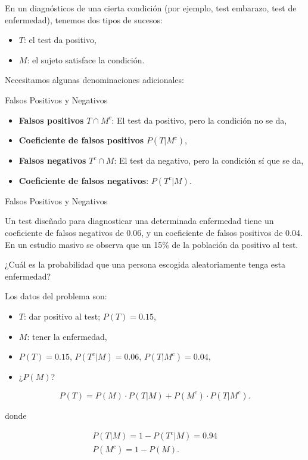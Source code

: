 \documentclass[
  letterpaper,
  DIV=11,
  numbers=noendperiod]{scrreprt}
\providecommand{\tightlist}{%
  \setlength{\itemsep}{0pt}\setlength{\parskip}{0pt}}\usepackage{longtable,booktabs,array}
\begin{document}
En un diagnósticos de una cierta condición (por ejemplo, test embarazo,
test de enfermedad), tenemos dos tipos de sucesos:

\begin{itemize}
\tightlist
\item
  \(T\): el test da positivo,
\item
  \(M\): el sujeto satisface la condición.
\end{itemize}

Necesitamos algunas denominaciones adicionales:

Falsos Positivos y Negativos

\begin{itemize}
\tightlist
\item
  \textbf{Falsos positivos} \(T\cap M^c\): El test da positivo, pero la
  condición no se da,
\item
  \textbf{Coeficiente de falsos positivos} \(P(T|M^c)\),
\item
  \textbf{Falsos negativos} \(T^c\cap M\): El test da negativo, pero la
  condición sí que se da,
\item
  \textbf{Coeficiente de falsos negativos}: \(P(T^c|M)\).
\end{itemize}

Falsos Positivos y Negativos

Un test diseñado para diagnosticar una determinada enfermedad tiene un
coeficiente de falsos negativos de 0.06, y un coeficiente de falsos
positivos de 0.04. En un estudio masivo se observa que un 15\% de la
población da positivo al test.

¿Cuál es la probabilidad que una persona escogida aleatoriamente tenga
esta enfermedad?

Los datos del problema son:

\begin{itemize}
\tightlist
\item
  \(T\): dar positivo al test; \(P(T)=0.15\),
\item
  \(M\): tener la enfermedad,
\item
  \(P(T)=0.15\), \(P(T^c|M)=0.06\), \(P(T|M^c)=0.04\),
\item
  ¿\(P(M)\)?
\end{itemize}

\[
P(T) =P(M)\cdot P(T|M)+P(M^c)\cdot P(T|M^c).
\]

donde

\[
\begin{array}{l}
P(T|M)=1-P(T^c|M)=0.94 \\
P(M^c)=1-P(M).
\end{array}
\]
\end{document}
